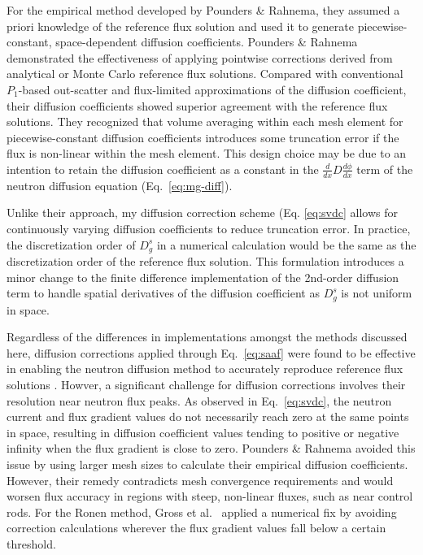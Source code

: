 For the empirical method developed by Pounders \& Rahnema, they assumed a priori knowledge of the
reference flux solution and used it to generate piecewise-constant, space-dependent diffusion
coefficients.
Pounders \& Rahnema \cite{pounders_diffusion_2009} demonstrated the effectiveness of applying
pointwise corrections derived from analytical or Monte Carlo reference flux solutions. Compared
with conventional $P_1$-based out-scatter and flux-limited approximations of the diffusion
coefficient, their diffusion coefficients showed superior agreement
with the reference flux solutions. They recognized that volume averaging within each mesh element
for piecewise-constant diffusion coefficients introduces some truncation error if the flux is
non-linear within the mesh element. This design choice may be due to an intention to retain the
diffusion coefficient as a constant in the $\frac{d}{dx}D\frac{d\phi}{dx}$ term of the neutron
diffusion equation (Eq.\ \ref{eq:mg-diff}).

Unlike their approach, my diffusion correction scheme (Eq. \ref{eq:svdc} allows for continuously
varying diffusion coefficients to reduce truncation error. In practice, the discretization order of
$D^s_g$ in a numerical calculation would be the same as the discretization order of
the reference flux solution. This formulation introduces a minor change to the finite difference
implementation of the 2nd-order diffusion term to handle spatial derivatives of the
diffusion coefficient as $D^s_g$ is not uniform in space.

Regardless of the differences in implementations amongst the methods discussed here,
diffusion corrections applied through Eq.\ \ref{eq:saaf} were
found to be effective in enabling the neutron diffusion method to accurately reproduce reference
flux solutions \cite{gross_comprehensive_2023, pounders_diffusion_2009}.
Howver, a significant challenge for diffusion corrections
involves their resolution near neutron flux peaks. As observed in Eq.\ \ref{eq:svdc}, the neutron
current and flux gradient values do not necessarily reach zero at the same points in space,
resulting in diffusion coefficient values tending to positive or negative infinity when the
flux gradient is close to zero. Pounders \& Rahnema avoided this issue by using
larger mesh sizes to calculate their empirical diffusion coefficients. However, their
remedy contradicts mesh convergence requirements and would worsen flux accuracy in regions with
steep, non-linear fluxes, such as near control rods. For the Ronen method, Gross et al.\
\cite{gross_comprehensive_2023} applied a numerical fix by avoiding correction
calculations wherever the flux gradient values fall below a certain threshold. 

